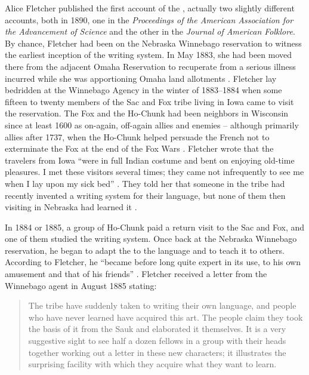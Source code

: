 \documentclass[output=paper]{LSP/langsci}
\begin{document}
Alice Fletcher published the first account of the  , actually two slightly different accounts, both in 1890, one in the \emph{Proceedings of the American Association for the Advancement of Science} and the other in the \emph{Journal of American Folklore}. By chance, Fletcher had been on the Nebraska Winnebago reservation to witness the earliest inception of the writing system. In May 1883, she had been moved there from the adjacent Omaha Reservation to recuperate from a serious illness incurred while she was apportioning Omaha land allotments \citep[90]{Mark1988}. Fletcher lay bedridden at the Winnebago Agency in the winter of 1883--1884 when some fifteen to twenty members of the Sac and Fox tribe living in Iowa came to visit the reservation. The Fox and the Ho-Chunk had been neighbors in Wisconsin since at least 1600 as on-again, off-again allies and enemies -- although primarily allies after 1737, when the Ho-Chunk helped persuade the French not to exterminate the Fox at the end of the Fox Wars \citep[75]{Bieder1995}. Fletcher wrote that the travelers from Iowa ``were in full Indian costume and bent on enjoying old-time pleasures. I met these visitors several times; they came not infrequently to see me when I lay upon my sick bed'' \citeyearpar[354]{Fletcher1890b}. They told her that someone in the tribe had recently invented a writing system for their language, but none of them then visiting in Nebraska had learned it \citeyearpar[299]{Fletcher1890a}.

In 1884 or 1885, a group of Ho-Chunk paid a return visit to the Sac and Fox, and one of them studied the  writing system. Once back at the Nebraska Winnebago reservation, he began to adapt the   to the  language and to teach it to others. According to Fletcher, he ``became before long quite expert in its use, to his own amusement and that of his friends'' \citeyearpar[299]{Fletcher1890a}. Fletcher received a letter from the Winnebago agent in August 1885 stating:

\begin{quote}
The tribe have suddenly taken to writing their own language, and people who have never learned  have acquired this art. The people claim they took the basis of it from the Sauk and elaborated it themselves. It is a very suggestive sight to see half a dozen fellows in a group with their heads together working out a letter in these new characters; it illustrates the surprising facility with which they acquire what they want to learn. \citeyearpar[299]{Fletcher1890a}
\end{quote}
\end{document}
